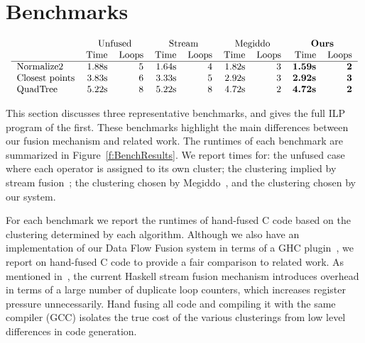\section{Benchmarks}
\label{s:Benchmarks}

\begin{figure*}
$$\begin{array}{c}

\begin{tabular}{lrrrrrrrr}
                & \multicolumn{2}{c}{Unfused}         & \multicolumn{2}{c}{Stream}
                & \multicolumn{2}{c}{Megiddo} &\multicolumn{2}{c}{\textbf{Ours}} \\
                & Time & Loops   & Time & Loops      & Time & Loops & Time & Loops   \\
\hline
Normalize2      & 1.88s & 5      & 1.64s & 4          & 1.82s & 3  & \textbf{1.59s} & \textbf{2}\\
Closest points  & 3.83s & 6      & 3.33s & 5          & 2.92s & 3  & \textbf{2.92s} & \textbf{3}\\
QuadTree        & 5.22s & 8      & 5.22s & 8          & 4.72s & 2  & \textbf{4.72s} & \textbf{2}\\
\end{tabular}

\end{array}$$
\caption{Benchmark results}
\label{f:BenchResults}
\end{figure*}

This section discusses three representative benchmarks, and gives the full ILP program of the first. These benchmarks highlight the main differences between our fusion mechanism and related work. The runtimes of each benchmark are summarized in Figure~\ref{f:BenchResults}. We report times for: the unfused case where each operator is assigned to its own cluster; the clustering implied by stream fusion~\cite{coutts2007streamfusion}; the clustering chosen by Megiddo~\cite{megiddo1998optimal}, and the clustering chosen by our system. 

For each benchmark we report the runtimes of hand-fused C code based on the clustering determined by each algorithm. Although we also have an implementation of our Data Flow Fusion system in terms of a GHC plugin~\cite{lippmeier2013flow}, we report on hand-fused C code to provide a fair comparison to related work. As mentioned in~\cite{lippmeier2013flow}, the current Haskell stream fusion mechanism introduces overhead in terms of a large number of duplicate loop counters, which increases register pressure unnecessarily. Hand fusing all code and compiling it with the same compiler (GCC) isolates the true cost of the various clusterings from low level differences in code generation.

